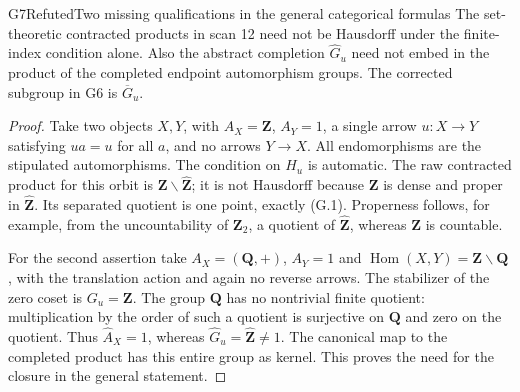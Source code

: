 \begin{result}{G7}{Refuted}{Two missing qualifications in the general categorical formulas}
The set-theoretic contracted products in scan 12 need not be Hausdorff
under the finite-index condition alone. Also the abstract completion
$\widehat G_u$ need not embed in the product of the completed endpoint
automorphism groups. The corrected subgroup in G6 is $\overline G_u$.
\end{result}
\begin{proof}
Take two objects $X,Y$, with $A_X=\mathbf Z$, $A_Y=1$, a single
arrow $u:X\to Y$ satisfying $ua=u$ for all $a$, and no arrows $Y\to X$.
All endomorphisms are the stipulated automorphisms. The condition on
$H_u$ is automatic. The raw contracted product for this orbit is
$\mathbf Z\backslash\widehat{\mathbf Z}$; it is not Hausdorff because
$\mathbf Z$ is dense and proper in $\widehat{\mathbf Z}$. Its separated
quotient is one point, exactly (G.1). Properness follows, for example,
from the uncountability of $\mathbf Z_2$, a quotient of
$\widehat{\mathbf Z}$, whereas $\mathbf Z$ is countable.

For the second assertion take $A_X=(\mathbf Q,+)$, $A_Y=1$ and
$\operatorname{Hom}(X,Y)=\mathbf Z\backslash\mathbf Q$, with the
translation action and again no reverse arrows. The stabilizer of the
zero coset is $G_u=\mathbf Z$. The group $\mathbf Q$ has no nontrivial
finite quotient: multiplication by the order of such a quotient is
surjective on $\mathbf Q$ and zero on the quotient. Thus
$\widehat A_X=1$, whereas $\widehat G_u=\widehat{\mathbf Z}\ne1$.
The canonical map to the completed product has this entire group as
kernel. This proves the need for the closure in the general statement.
\end{proof}

